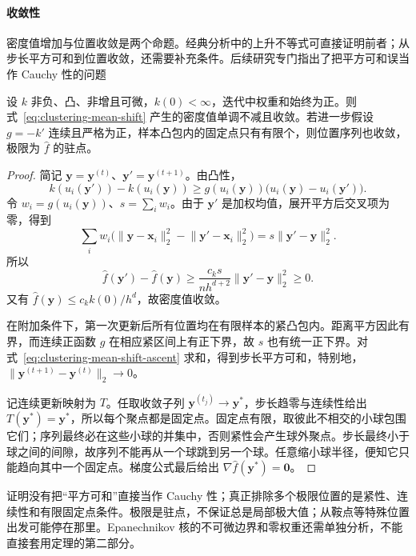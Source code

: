 \paragraph{收敛性}
密度值增加与位置收敛是两个命题。经典分析中的上升不等式可直接证明前者；从步长平方可和到位置收敛，还需要补充条件。后续研究专门指出了把平方可和误当作 Cauchy 性的问题

\begin{theorem}
 \label{thm:clustering-mean-shift}
 设 $k$ 非负、凸、非增且可微，$k(0)<\infty$，迭代中权重和始终为正。则式~\eqref{eq:clustering-mean-shift} 产生的密度值单调不减且收敛。若进一步假设 $g=-k'$ 连续且严格为正，样本凸包内的固定点只有有限个，则位置序列也收敛，极限为 $\hat f$ 的驻点。
\end{theorem}
\begin{proof}
简记 $\bm{y}=\bm{y}^{(t)}$、$\bm{y}'=\bm{y}^{(t+1)}$。由凸性，
\[
 k(u_i(\bm{y}'))-k(u_i(\bm{y}))
 \geq g(u_i(\bm{y}))
       \bigl(u_i(\bm{y})-u_i(\bm{y}')\bigr).
\]
令 $w_i=g(u_i(\bm{y}))$、$s=\sum_iw_i$。由于 $\bm{y}'$ 是加权均值，展开平方后交叉项为零，得到
\[
 \sum_iw_i\bigl(
 \lVert\bm{y}-\bm{x}_i\rVert_2^2
 -\lVert\bm{y}'-\bm{x}_i\rVert_2^2\bigr)
 =s\lVert\bm{y}'-\bm{y}\rVert_2^2.
\]
所以
\begin{equation}
 \hat f(\bm{y}')-\hat f(\bm{y})
 \geq\frac{c_k s}{nh^{d+2}}
       \lVert\bm{y}'-\bm{y}\rVert_2^2\geq0.
 \label{eq:clustering-mean-shift-ascent}
\end{equation}
又有 $\hat f(\bm{y})\leq c_k k(0)/h^d$，故密度值收敛。

在附加条件下，第一次更新后所有位置均在有限样本的紧凸包内。距离平方因此有界，而连续正函数 $g$ 在相应紧区间上有正下界，故 $s$ 也有统一正下界。对式~\eqref{eq:clustering-mean-shift-ascent} 求和，得到步长平方可和，特别地，$\lVert\bm{y}^{(t+1)}-\bm{y}^{(t)}\rVert_2\to0$。

记连续更新映射为 $T$。任取收敛子列 $\bm{y}^{(t_j)}\to\bm{y}^\ast$，步长趋零与连续性给出 $T(\bm{y}^\ast)=\bm{y}^\ast$，所以每个聚点都是固定点。固定点有限，取彼此不相交的小球包围它们；序列最终必在这些小球的并集中，否则紧性会产生球外聚点。步长最终小于球之间的间隙，故序列不能再从一个球跳到另一个球。任意缩小球半径，便知它只能趋向其中一个固定点。梯度公式最后给出 $\nabla\hat f(\bm{y}^\ast)=\bm{0}$。
\end{proof}

证明没有把“平方可和”直接当作 Cauchy 性；真正排除多个极限位置的是紧性、连续性和有限固定点条件。极限是驻点，不保证总是局部极大值；从鞍点等特殊位置出发可能停在那里。Epanechnikov 核的不可微边界和零权重还需单独分析，不能直接套用定理的第二部分。

